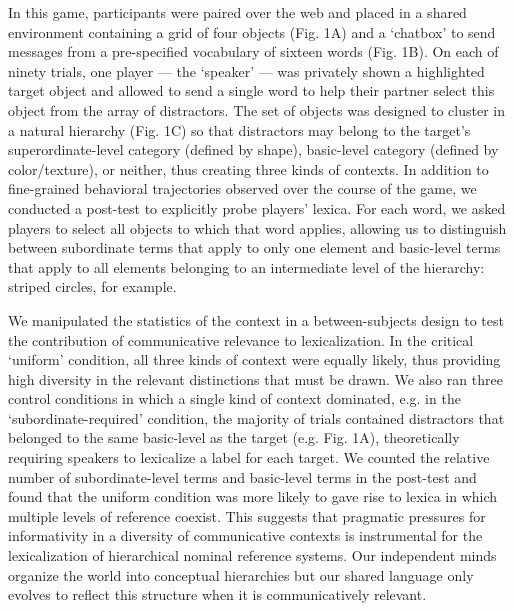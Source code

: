 \documentclass{evolang12}
\begin{document}
In this game, participants were paired over the web and placed in a shared environment containing a grid of four objects (Fig. 1A) and a `chatbox' to send messages from a pre-specified vocabulary of sixteen words (Fig. 1B). On each of ninety trials, one player --- the `speaker' --- was privately shown a highlighted target object and allowed to send a single word to help their partner select this object from the array of distractors. The set of objects was designed to cluster in a natural hierarchy (Fig. 1C) so that distractors may belong to the target's superordinate-level category (defined by shape), basic-level category (defined by color/texture), or neither, thus creating three kinds of contexts. In addition to fine-grained behavioral trajectories observed over the course of the game, we conducted a post-test to explicitly probe players' lexica. For each word, we asked players to select all objects to which that word applies, allowing us to distinguish between subordinate terms that apply to only one element and basic-level terms that apply to all elements belonging to an intermediate level of the hierarchy: striped circles, for example. %

We manipulated the statistics of the context in a between-subjects design to test the contribution of communicative relevance to lexicalization. In the critical `uniform' condition, all three kinds of context were equally likely, thus providing high diversity in the relevant distinctions that must be drawn. We also ran three control conditions in which a single kind of context dominated, e.g. in the `subordinate-required' condition, the majority of trials contained distractors that belonged to the same basic-level as the target (e.g. Fig. 1A), theoretically requiring speakers to lexicalize a label for each target. We counted the relative number of subordinate-level terms and basic-level terms in the post-test and found that the uniform condition was more likely to gave rise to lexica in which multiple levels of reference coexist. This suggests that pragmatic pressures for informativity in a diversity of communicative contexts is instrumental for the lexicalization of hierarchical nominal reference systems. Our independent minds organize the world into conceptual hierarchies but our shared language only evolves to reflect this structure when it is communicatively relevant. 
\end{document}

